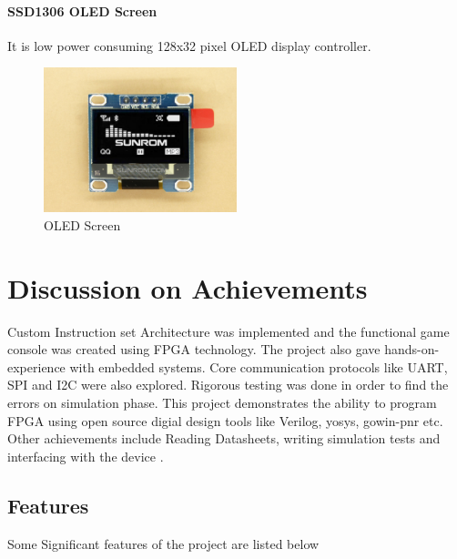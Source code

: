\documentclass[a4paper,12pt]{article}
\begin{document}
    \paragraph{SSD1306 OLED Screen}
    It is low power consuming 128x32 pixel OLED display controller. 

    \begin{figure}[H]
        \centering
        \includegraphics[width=0.5\textwidth ]{./images/ssd1306.jpg}
        \caption{OLED Screen}
    \end{figure}
    \newpage
    \section{Discussion on Achievements}

    Custom Instruction set Architecture was implemented and the functional game console was created using FPGA technology. The project also gave hands-on-experience with embedded systems. Core communication protocols like UART, SPI and I2C were also explored. Rigorous testing was done in order to find the errors on simulation phase. This project demonstrates the ability to program FPGA using open source digial design tools like Verilog, yosys, gowin-pnr etc. Other achievements include Reading Datasheets, writing simulation tests and interfacing with the device . 

    \subsection{Features}
    Some Significant features of the project are listed below
\end{document}
